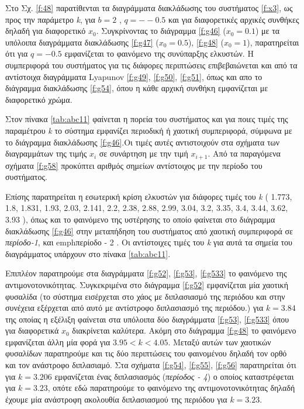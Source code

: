 Στο Σχ. \ref{f:48} παρατίθενται τα διαγράμματα διακλάδωσης του συστήματος \ref{f:x3}, ως προς την παράμετρο \emph{k}, για $b = 2$ , $q =- -0.5$ και για διαφορετικές αρχικές συνθήκες δηλαδή για διαφορετικό \(x_0\). Συγκρίνοντας το διάγραμμα \ref{f:g46} (\(x_0=0.1\)) με τα υπόλοιπα διαγράμματα διακλάδωσης \ref{f:g47} (\(x_0=0.5\)), \ref{f:g48} (\(x_0=1\)), παρατηρείται ότι για $q=-0.5$ εμφανίζεται το φαινόμενο της συνύπαρξης ελκυστών. Η συμπεριφορά του συστήματος για τις διάφορες περιπτώσεις επιβεβαιώνεται και από τα αντίστοιχα διαγράμματα Lyapunov \ref{f:g49}, \ref{f:g50}, \ref{f:g51}, όπως και απο το διάγραμμα διακλάδωσης \ref{f:g54}, όπου η κάθε αρχική συνθήκη εμφανίζεται με διαφορετικό χρώμα.

Στον πίνακα \ref{tab:abc11} φαίνεται η πορεία του συστήματος και για ποιες τιμές της παραμέτρου \emph{k} το σύστημα εμφανίζει περιοδική ή χαοτική συμπεριφορά, σύμφωνα με το διάγραμμα διακλάδωσης \ref{f:g46}.Οι τιμές αυτές αντιστοιχούν στα σχήματα των διαγραμμάτων της τιμής \(x_i\) σε συνάρτηση με την τιμή \(x_{i+1}\). Από τα παραγόμενα σχήματα \ref{f:g58} προκύπτει αριθμός σημείων αντίστοιχος με την περίοδο του συστήματος.

Επίσης παρατηρείται η εσωτερική κρίση ελκυστών για διάφορες τιμές του \emph{k} ( 1.773, 1.8, 1.831, 1.93, 2.03, 2.141, 2.2, 2.38,
2.88, 2.99, 3.04, 3.2, 3.35, 3.4, 3.44, 3.62, 3.93 ), όπως και το φαινόμενο της υστέρησης το οποίο φαίνεται στο διάγραμμα διακλάδωσης \ref{f:g46} στην μεταπήδηση του συστήματος από χαοτική συμπεριφορά σε \emph{περίοδο-1}, και emph{περίοδο - 2} . Οι αντίστοιχες τιμές του \emph{k} για αυτά τα σημεία του διαγράμματος υπάρχουν στο πίνακα \ref{tab:abc11}.

Επιπλέον παρατηρούμε στα διαγράμματα \ref{f:g52}, \ref{f:g53}, \ref{f:g533} το φαινόμενο της αντιμονοτονικότητας. Συγκεκριμένα στο διάγραμμα \ref{f:g52} εμφανίζεται μία χαοτική φυσαλίδα (το σύστημα εισέρχεται στο χάος με διπλασιασμό της περιόδου και στην συνέχεια εξέρχεται από αυτό με αντίστροφο διπλασιασμό της περιόδου.) για $k=3.84$ της οποίας η εξέλιξη φαίνεται στα υπόλοιπα δύο διαγράμματα \ref{f:g53}, \ref{f:g533} όπου για διαφορετικά $x_0$ διακρίνεται καλύτερα. Ακόμη στο διάγραμμα \ref{f:g48} το φαινόμενο εμφανίζεται άλλη μία φορά για $3.95<k<4.05$.
Μεταξύ αυτών των χαοτικών φυσαλίδων παρατηρούμε και τις δύο περιπτώσεις του φαινομένου δηλαδή τον ορθό και τον ανάστροφο διπλασιαμό.%
Στα σχήματα \ref{f:g54}, \ref{f:g55}, \ref{f:g56} παρατηρείται ότι για $k=3.206$ εμφανίζεται ένας διπλασιασμός (\emph{περίοδος - 4}) ο οποίος καταστρέφεται για $k=3.23$, οπότε εδώ παρατηρούμε το φαινόμενο της αντιμονοτονικότητας δηλαδή έχουμε μία ανάστροφη ακολουθία διπλασιασμού της περιόδου για $k=3.23$. 

